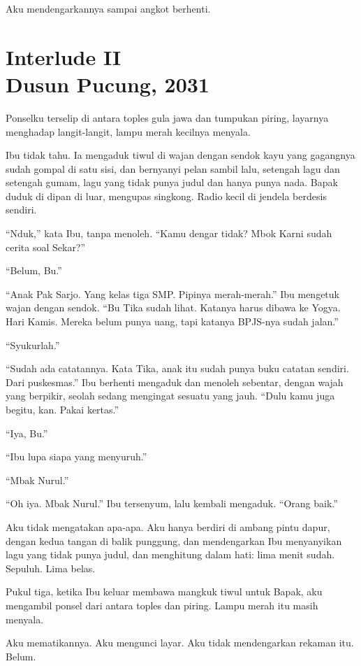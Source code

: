 \documentclass[11pt,twoside,openany]{book}
\begin{document}
Aku mendengarkannya sampai angkot berhenti.

\chapter*{Interlude II\\[0.5em]\normalsize\upshape Dusun Pucung, 2031}
Ponselku terselip di antara toples gula jawa dan tumpukan piring, layarnya menghadap langit-langit, lampu merah kecilnya menyala.

Ibu tidak tahu. Ia mengaduk tiwul di wajan dengan sendok kayu yang gagangnya sudah gompal di satu sisi, dan bernyanyi pelan sambil lalu, setengah lagu dan setengah gumam, lagu yang tidak punya judul dan hanya punya nada. Bapak duduk di dipan di luar, mengupas singkong. Radio kecil di jendela berdesis sendiri.

``Nduk,'' kata Ibu, tanpa menoleh. ``Kamu dengar tidak? Mbok Karni sudah cerita soal Sekar?''

``Belum, Bu.''

``Anak Pak Sarjo. Yang kelas tiga SMP. Pipinya merah-merah.'' Ibu mengetuk wajan dengan sendok. ``Bu Tika sudah lihat. Katanya harus dibawa ke Yogya. Hari Kamis. Mereka belum punya uang, tapi katanya BPJS-nya sudah jalan.''

``Syukurlah.''

``Sudah ada catatannya. Kata Tika, anak itu sudah punya buku catatan sendiri. Dari puskesmas.'' Ibu berhenti mengaduk dan menoleh sebentar, dengan wajah yang berpikir, seolah sedang mengingat sesuatu yang jauh. ``Dulu kamu juga begitu, kan. Pakai kertas.''

``Iya, Bu.''

``Ibu lupa siapa yang menyuruh.''

``Mbak Nurul.''

``Oh iya. Mbak Nurul.'' Ibu tersenyum, lalu kembali mengaduk. ``Orang baik.''

Aku tidak mengatakan apa-apa. Aku hanya berdiri di ambang pintu dapur, dengan kedua tangan di balik punggung, dan mendengarkan Ibu menyanyikan lagu yang tidak punya judul, dan menghitung dalam hati: lima menit sudah. Sepuluh. Lima belas.

Pukul tiga, ketika Ibu keluar membawa mangkuk tiwul untuk Bapak, aku mengambil ponsel dari antara toples dan piring. Lampu merah itu masih menyala.

Aku mematikannya. Aku mengunci layar. Aku tidak mendengarkan rekaman itu. Belum.
\end{document}
